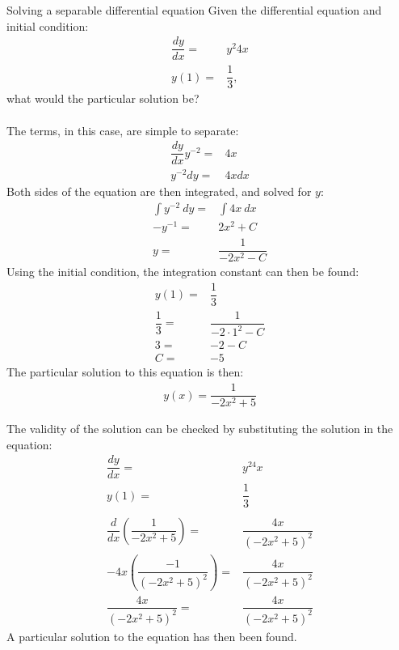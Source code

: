 \begin{example}{Solving a separable differential equation}{}
Given the differential equation and initial condition:
\begin{align*}
	\dfrac{dy}{dx} =& y^2 4x \\
	y(1) =& \dfrac{1}{3},
\end{align*}
what would the particular solution be?
\\ \\
The terms, in this case, are simple to separate: 
\begin{align*}
	\dfrac{dy}{dx} y^{-2} =& 4x \\
	y^{-2} dy =& 4x dx 
\end{align*}
Both sides of the equation are then integrated, and solved for $y$:
\begin{align*}
	\int{y^{-2}\ dy} =& \int{4x\  dx} \\
	-y^{-1} =& 2x^2 +C \\
	y =& \dfrac{1}{-2x^2-C}
\end{align*}
Using the initial condition, the integration constant can then be found:
\begin{align*}
	y(1) =& \dfrac{1}{3} \\
	\dfrac{1}{3} =& \dfrac{1}{-2 \cdot 1^2-C} \\
	3 =& -2-C \\
	C =& -5
\end{align*}
The particular solution to this equation is then:
\begin{align*}
	y(x) = \dfrac{1}{-2x^2+5}
\end{align*}

The validity of the solution can be checked by substituting the solution in the equation:
\begin{align*}
	\dfrac{dy}{dx} =& y^24x \\
	y(1) =& \dfrac{1}{3}  \\
	\\
	\dfrac{d}{dx} \left(\dfrac{1}{-2x^2+5}\right) =& \dfrac{4x}{(-2x^2+5)^2} \\
	-4x\left(\dfrac{-1}{(-2x^2+5)^2}\right)  =& \dfrac{4x}{(-2x^2+5)^2} \\
	\dfrac{4x}{(-2x^2+5)^2} =& \dfrac{4x}{(-2x^2+5)^2}
\end{align*}
A particular solution to the equation has then been found.
\end{example}
